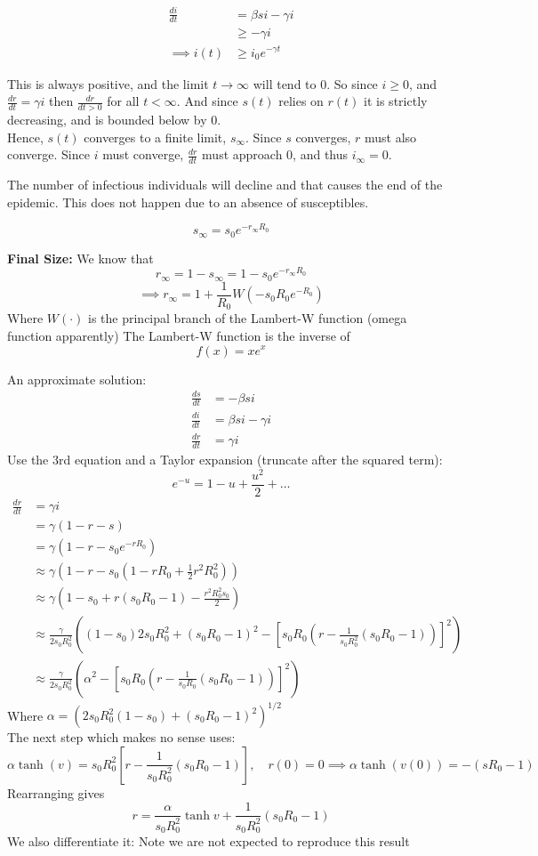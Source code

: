 \documentclass{X:/Documents/Coding/Latex/myassignment}
\begin{document}
\begin{align*}
    \frac{di}{dt} &= \beta si - \gamma i\\
    &\geq  -\gamma i\\
    \implies i(t) &\geq i_0 e^{-\gamma t}
\end{align*}

This is always positive, and the limit $t\to \infty$ will tend to $0$.
So since $i \geq 0$, and $\frac{dr}{dt} = \gamma i$ then $\frac{dr}{dt > 0}$ for all $t<\infty$.
And since $s(t)$ relies on $r(t)$ it is strictly decreasing, and is bounded below by $0$.\\
Hence, $s(t)$ converges to a finite limit, $s_\infty$. Since $s$ converges, $r$ must also converge. 
Since $i$ must converge, $\frac{dr}{dt}$ must approach $0$, and thus $i_\infty = 0$.

The number of infectious individuals will decline and that causes the end of the epidemic. This does not happen due to an absence of susceptibles.

\[s_\infty = s_0 e^{-r_\infty R_0}\]

\textbf{Final Size:}
We know that 
\[r_\infty = 1-s_\infty = 1-s_0 e^{-r_\infty R_0}\]
\[\implies r_\infty = 1 + \frac1{R_0} W (-s_0 R_0 e^{-R_0})\]
Where $W(\cdot)$ is the principal branch of the Lambert-W function (omega function apparently)
The Lambert-W function is the inverse of
\[f(x) = xe^{x}\]

An approximate solution:
\begin{align*}
    \frac{ds}{dt}&= -\beta si\\
    \frac{di}{dt}&= \beta si - \gamma i\\
    \frac{dr}{dt}&= \gamma i
\end{align*}
Use the 3rd equation and a Taylor expansion (truncate after the squared term):
\[e^{-u} = 1 - u + \frac{u^2}{2} + \hdots\]
\begin{align*}
    \frac{dr}{dt}&=\gamma i\\
    &= \gamma(1-r-s)\\
    &= \gamma(1-r-s_0e^{-rR_0})\\
    &\approx \gamma\left(1-r-s_0\left(1-rR_0 + \frac12 r^2 R_0^2\right)\right)\\
    &\approx \gamma(1-s_0 + r(s_0R_0 - 1) - \frac{r^2R_0^2s_0}{2})\\
    &\approx \frac{\gamma}{2s_0R_0^2} \left((1-s_0)2s_0R_0^2 + (s_0R_0-1)^2 - \left[s_0R_0(r-\frac{1}{s_0R_0^2}(s_0R_0-1))\right]^2\right)\\
    &\approx \frac{\gamma}{2s_0R_0^2}\left(\alpha^2 - \left[s_0R_0(r- \frac{1}{s_0R_0}(s_0R_0-1))\right]^2\right)
\end{align*}
Where $\alpha = \left(2s_0R_0^2 (1-s_0) + (s_0R_0-1)^2\right)^{1/2}$\\
The next step which makes no sense uses:
\[\alpha \tanh(v) = s_0 R_0^2 [r- \frac{1}{s_0R_0^2}(s_0R_0-1)], \quad r(0)=0 \implies \alpha \tanh(v(0)) = -(sR_0-1) \]
Rearranging gives
\[r = \frac{\alpha}{s_0R_0^2} \tanh v + \frac{1}{s_0R_0^2}(s_0R_0-1) \]
We also differentiate it:
Note we are not expected to reproduce this result
\end{document}
